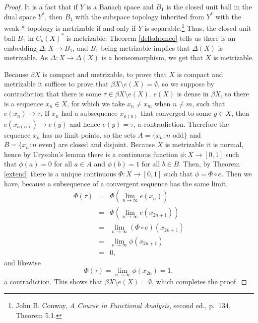 \documentclass{article}
\theoremstyle{definition}
\begin{document}
\begin{proof}
It is a fact that if $Y$ is a Banach space  and $B_1$ is the closed unit ball in the dual space $Y^*$, then $B_1$ with the subspace
topology inherited from $Y^*$ with the weak-* topology is metrizable if and only if $Y$ is separable.\footnote{John
B. Conway, {\em A Course in Functional Analysis}, second ed., p.~134, Theorem 5.1.}
Thus, the closed unit ball $B_1$ in $C_b(X)^*$ is metrizable. 
Theorem \ref{deltahomeo} tells us there is an embedding $\Delta:X \to B_1$, and $B_1$ being metrizable implies that $\Delta(X)$ is metrizable. As $\Delta:X \to 
\Delta(X)$ is a homeomorphism,  we get that $X$ is metrizable.


Because $\beta X$ is compact and metrizable, to prove that $X$ is compact and metrizable it suffices to prove
that $\beta X \setminus e(X) = \emptyset$,
so we suppose by contradiction that there is some $\tau \in \beta X \setminus e(X)$. 
$e(X)$ is dense in $\beta X$, so there is a sequence $x_n \in X$, for which we take $x_n \neq x_m$ when $n \neq m$, such that $e(x_n) \to \tau$.
If $x_n$ had a subsequence $x_{a(n)}$ that converged to some $y \in X$, then
$e(x_{a(n)}) \to e(y)$ and hence $e(y)=\tau$, a contradiction. Therefore the sequence $x_n$ has no limit points, so
the sets
$A=\{x_n: \textrm{$n$ odd}\}$ and $B=\{x_n:\textrm{$n$ even}\}$ are closed and disjoint. 
Because $X$ is metrizable it is normal, hence by Urysohn's lemma there is a continuous function $\phi:X \to [0,1]$
such that $\phi(a)=0$ for all $a \in A$ and $\phi(b)=1$ for all $b \in B$. Then, by Theorem \ref{extend} there is a unique
continuous $\Phi:X \to [0,1]$ such that $\phi = \Phi \circ e$. Then we have, because a subsequence of a convergent sequence has the same limit,
\begin{eqnarray*}
\Phi(\tau)&=&\Phi\left( \lim_{n \to \infty} e(x_n) \right)\\
& =& \Phi\left( \lim_{n \to \infty} e(x_{2n+1}) \right)\\
& = &\lim_{n \to \infty} (\Phi \circ e)(x_{2n+1})\\
&=&\lim_{n \to \infty} \phi(x_{2n+1})\\
&=&0,
\end{eqnarray*}
and likewise
\[
\Phi(\tau) = 
\lim_{n \to \infty} \phi(x_{2n}) = 1,
\]
a contradiction.
This shows that $\beta X \setminus e(X) = \emptyset$, which completes the proof.
\end{proof}
\end{document}

